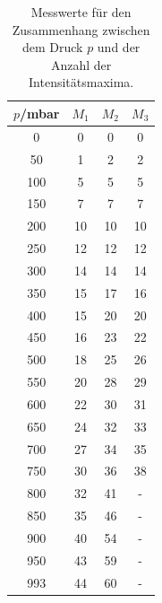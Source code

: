 \begin{table}
  \caption{Messwerte für den Zusammenhang zwischen dem Druck $p$ und der Anzahl
  der Intensitätsmaxima.}
  \label{tab:luft}
  \centering
  \begin{tabular}{c|c|c|c}
    $p$/mbar &  $M_1$ & $M_2$ & $M_3$ \\ \midrule
    0 & 0 & 0 & 0 \\
    50 & 1 & 2 & 2 \\
    100 & 5 & 5 & 5 \\
    150 & 7 & 7 & 7 \\
    200 & 10  & 10  & 10 \\
    250 & 12  & 12  & 12 \\
    300 & 14  & 14  & 14 \\
    350 & 15  & 17  & 16 \\
    400 & 15  & 20  & 20 \\
    450 & 16  & 23  & 22 \\
    500 & 18  & 25  & 26 \\
    550 & 20  & 28  & 29 \\
    600 & 22  & 30  & 31 \\
    650 & 24  & 32  & 33 \\
    700 & 27  & 34  & 35 \\
    750 & 30  & 36  & 38 \\
    800 & 32  & 41  & - \\
    850 & 35  & 46  & - \\
    900 & 40  & 54  & - \\
    950 & 43  & 59  & - \\
    993 & 44  & 60  & - \\
  \end{tabular}
\end{table}
